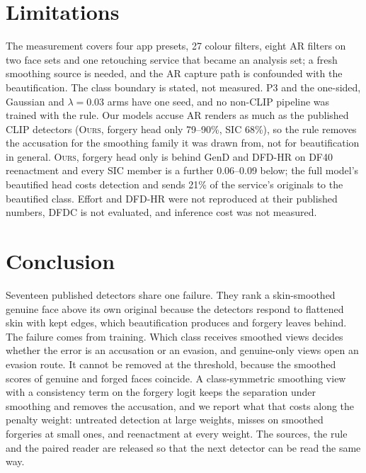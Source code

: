 \documentclass[conference]{IEEEtran}
\newcommand{\oursB}{\textsc{Ours}, forgery head only}
\begin{document}
\section{Limitations}
\label{sec:limits}
The measurement covers four app presets, 27 colour filters, eight AR filters on two face sets and one retouching service that
became an analysis set; a fresh smoothing source is needed, and the AR capture path is confounded with the beautification. The
class boundary is stated, not measured. P3 and the one-sided, Gaussian and $\lambda=0.03$ arms have one seed, and no non-CLIP
pipeline was trained with the rule. Our models accuse AR renders as much as the published CLIP detectors (\oursB{} 79--90\%,
SIC 68\%), so the rule removes the accusation for the smoothing family it was drawn from, not for beautification in general.
\oursB{} is behind GenD and DFD-HR on DF40 reenactment and every SIC member is a further 0.06--0.09 below; the full model's
beautified head costs detection and sends 21\% of the service's originals to the beautified class. Effort and DFD-HR were not
reproduced at their published numbers, DFDC is not evaluated, and inference cost was not measured.

\section{Conclusion}
Seventeen published detectors share one failure. They rank a skin-smoothed genuine face above its own original because the detectors respond to flattened skin with kept edges, which beautification produces and forgery leaves
behind. The failure comes from training. Which class receives smoothed views decides whether the error is an accusation or an
evasion, and genuine-only views open an evasion route. It cannot be removed at the threshold, because the smoothed scores of genuine and forged faces
coincide. A class-symmetric smoothing view with a consistency term on the forgery logit keeps the separation under smoothing
and removes the accusation, and we report what that costs along the penalty weight: untreated detection at large weights,
misses on smoothed forgeries at small ones, and reenactment at every weight. The sources, the rule and the paired reader are
released so that the next detector can be read the same way.



\end{document}
